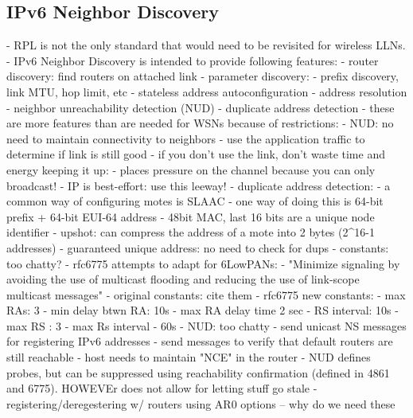 \subsection{IPv6 Neighbor Discovery}
- RPL is not the only standard that would need to be revisited for wireless LLNs.
- IPv6 Neighbor Discovery is intended to provide following features:
    - router discovery: find routers on attached link
    - parameter discovery:
        - prefix discovery, link MTU, hop limit, etc
    - stateless address autoconfiguration
    - address resolution
    - neighbor unreachability detection (NUD)
    - duplicate address detection
- these are more features than are needed for WSNs because of restrictions:
    - NUD: no need to maintain connectivity to neighbors
        - use the application traffic to determine if link is still good
        - if you don't use the link, don't waste time and energy keeping it up:
            - places pressure on the channel because you can only broadcast!
        - IP is best-effort: use this leeway!
    - duplicate address detection:
        - a common way of configuring motes is SLAAC
        - one way of doing this is 64-bit prefix + 64-bit EUI-64 address
        - 48bit MAC, last 16 bits are a unique node identifier
        - upshot: can compress the address of a mote into 2 bytes (2^16-1 addresses)
        - guaranteed unique address: no need to check for dups
- constants: too chatty?
    - rfc6775 attempts to adapt for 6LowPANs:
    - "Minimize signaling by avoiding the use of multicast
      flooding and reducing the use of link-scope multicast messages"
    - original constants: cite them
    - rfc6775 new constants:
        - max RAs: 3
        - min delay btwn RA: 10s
        - max RA delay time 2 sec
        - RS interval: 10s
        - max RS : 3
        - max Rs interval - 60s
- NUD: too chatty
    - send unicast NS messages for registering IPv6 addresses
    - send messages to verify that default routers are still reachable
    - host needs to maintain "NCE" in the router
    - NUD defines probes, but can be suppressed using reachability confirmation
      (defined in 4861 and 6775). HOWEVEr does not allow for letting stuff go stale
    - registering/deregestering w/ routers using AR0 options -- why do we need these
\fi
